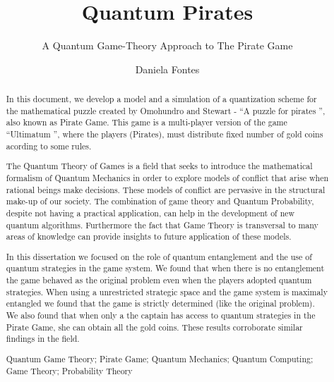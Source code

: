 \documentclass{llncs} %
\title{Quantum Pirates} %
\subtitle{A Quantum Game-Theory Approach to The Pirate Game}
\author{Daniela Fontes}
\institute{	72390\\
		Instituto Superior T\'ecnico
\\
\email{daniela.fontesl@ist.utl.pt}
}
\begin{document}
	\maketitle

	\begin{abstract}
		In this document, we develop a model and a simulation of a quantization scheme for the mathematical puzzle created by Omohundro and Stewart - ``A puzzle for pirates '', also known as Pirate Game. This game is a multi-player version of the game ``Ultimatum '', where the players (Pirates), must distribute fixed number of gold coins acording to some rules.

The Quantum Theory of Games is a field that seeks to introduce the mathematical formalism of Quantum Mechanics in order to explore models of conflict that arise when rational beings make decisions. These models of conflict are pervasive in the structural make-up of our society. The combination of game theory and Quantum Probability, despite not having a practical application, can help in the development of new quantum algorithms. Furthermore the fact that Game Theory is transversal to many areas of knowledge can provide insights to future application of these models.

In this dissertation we focused on the role of quantum entanglement and the use of quantum strategies in the game system. We found that when there is no entanglement the game behaved as the original problem even when the players adopted quantum strategies. When using a unrestricted strategic space and the game system is maximaly entangled we found that the game is strictly determined (like the original problem). We also found that when only a the captain has access to quantum strategies in the Pirate Game, she can obtain all the gold coins. These results corroborate similar findings in the field.

		\keywords Quantum Game Theory; Pirate Game; Quantum Mechanics; Quantum Computing; Game Theory; Probability Theory

\end{abstract}
\end{document}
